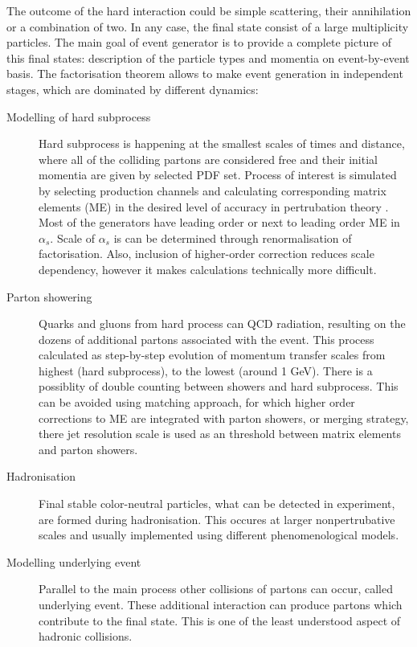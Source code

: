 The outcome of the hard interaction could be simple scattering, their annihilation or a combination of two. In any case, the final state consist of a large multiplicity particles. The main goal of event generator is to provide a complete picture of this final states: description of the particle types and momentia on event-by-event basis. The factorisation theorem allows to make event generation in independent stages, which are dominated by different dynamics:
\begin{description}

\item[Modelling of hard subprocess] Hard subprocess is happening at the smallest scales of times and distance, where all of the colliding partons are considered free and their initial momentia are given by selected PDF set. Process of interest is simulated by selecting production channels and calculating corresponding matrix elements (ME) in the desired level of accuracy in pertrubation theory . Most of the generators have leading order or next to leading order ME in $\alpha_s$. Scale of $\alpha_s$ is can be determined through renormalisation of factorisation. Also, inclusion of higher-order correction reduces scale dependency, however it makes calculations technically more difficult.
\item[Parton showering] Quarks and gluons from hard process can QCD radiation, resulting on the dozens of additional partons associated with the event. This process calculated as step-by-step evolution of momentum transfer scales from highest (hard subprocess), to the lowest (around 1 GeV). 
There is a possiblity of double counting between showers and hard subprocess. This can be avoided using matching approach, for which higher order corrections to ME are integrated with parton showers, or merging strategy, there jet resolution scale is used as an threshold between matrix elements and parton showers. 
\item[Hadronisation] Final stable color-neutral particles, what can be detected in experiment, are formed during hadronisation. This occures at larger nonpertrubative scales and  usually implemented using different phenomenological models.
\item[Modelling underlying event] Parallel to the main process other collisions of partons can occur, called underlying event. These additional interaction can produce partons which contribute to the final state. This is one of the least understood aspect of hadronic collisions. 

\end{description}

